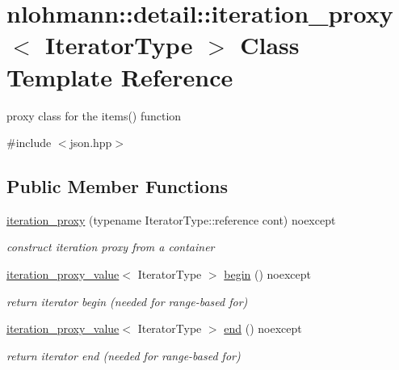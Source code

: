 \hypertarget{classnlohmann_1_1detail_1_1iteration__proxy}{}\section{nlohmann\+:\+:detail\+:\+:iteration\+\_\+proxy$<$ Iterator\+Type $>$ Class Template Reference}
\label{classnlohmann_1_1detail_1_1iteration__proxy}


proxy class for the items() function  




{\ttfamily \#include $<$json.\+hpp$>$}

\subsection*{Public Member Functions}
\begin{DoxyCompactItemize}
\item 
\mbox{\label{classnlohmann_1_1detail_1_1iteration__proxy_afe257e972e3b4658ef2e355f7389d4a5}} 
\hyperlink{classnlohmann_1_1detail_1_1iteration__proxy_afe257e972e3b4658ef2e355f7389d4a5}{iteration\+\_\+proxy} (typename Iterator\+Type\+::reference cont) noexcept
\begin{DoxyCompactList}\small\item\em construct iteration proxy from a container \end{DoxyCompactList}\item 
\mbox{\label{classnlohmann_1_1detail_1_1iteration__proxy_a379f86709d340c4ab1995539b8af623d}} 
\hyperlink{classnlohmann_1_1detail_1_1iteration__proxy__value}{iteration\+\_\+proxy\+\_\+value}$<$ Iterator\+Type $>$ \hyperlink{classnlohmann_1_1detail_1_1iteration__proxy_a379f86709d340c4ab1995539b8af623d}{begin} () noexcept
\begin{DoxyCompactList}\small\item\em return iterator begin (needed for range-\/based for) \end{DoxyCompactList}\item 
\mbox{\label{classnlohmann_1_1detail_1_1iteration__proxy_a90091f8492d23576edef72c5e8b9d4cf}} 
\hyperlink{classnlohmann_1_1detail_1_1iteration__proxy__value}{iteration\+\_\+proxy\+\_\+value}$<$ Iterator\+Type $>$ \hyperlink{classnlohmann_1_1detail_1_1iteration__proxy_a90091f8492d23576edef72c5e8b9d4cf}{end} () noexcept
\begin{DoxyCompactList}\small\item\em return iterator end (needed for range-\/based for) \end{DoxyCompactList}\end{DoxyCompactItemize}


